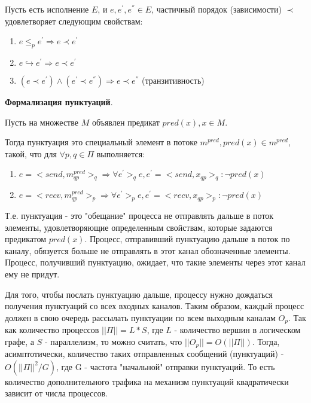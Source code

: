 \documentclass[12pt]{article}
\begin{document}
\bigskip
{

Пусть есть исполнение $E$, и $e, e^{'}, e^{''} \in E$, частичный порядок (зависимости) $\prec$ удовлетворяет следующим свойствам:

\begin{enumerate}
    \item $e \leq_p e^{'} \Rightarrow e \prec e^{'}$
    \item $e \hookrightarrow e^{'} \Rightarrow e \prec e^{'}$
    \item $(e \prec e^{'}) \land (e^{'} \prec e^{''}) \Rightarrow e \prec e^{''}$ (транзитивность)
\end{enumerate}
}

\textbf{Формализация пунктуаций}.

Пусть на множестве $M$ объявлен предикат $pred(x), x \in M$.

Тогда пунктуация это специальный элемент в потоке $m^{pred}, pred(x) \in m^{pred}$, такой, что для $\forall p,q \in \Pi$ выполняется:

\begin{enumerate}
    \item $e = <send,m^{pred}_{qp}>_q \Rightarrow \forall e^{'} >_q e, e^{'} = <send, x_{qp}>_q: \neg pred(x)$
    \item $e = <recv,m^{pred}_{qp}>_p \Rightarrow \forall e^{'} >_p e, e^{'} = <recv, x_{qp}>_p: \neg pred(x)$
\end{enumerate}

Т.е. пунктуация - это "обещание" процесса не отправлять дальше в поток элементы, удовлетворяющие определенным свойствам, которые задаются предикатом $pred(x)$. Процесс, отправивший пунктуацию дальше в поток по каналу, обязуется больше не отправлять в этот канал обозначенные элементы. Процесс, получивший пунктуацию, ожидает, что такие элементы через этот канал ему не придут.

Для того, чтобы послать пунктуацию дальше, процессу нужно дождаться получения пунктуаций со всех входных каналов. Таким образом, каждый процесс должен в свою очередь рассылать пунктуации по всем выходным каналам $O_p$. Так как количество процессов $||\Pi|| = L * S$, где $L$ - количество вершин в логическом графе, а $S$ - параллелизм, то можно считать, что $||O_p|| = O(||\Pi||)$. Тогда, асимптотически, количество таких отправленных сообщений (пунктуаций) - $O(||\Pi||^2 / G)$, где G - частота "начальной" отправки пунктуаций. То есть количество дополнительного трафика на механизм пунктуаций квадратически зависит от числа процессов.
\end{document}
